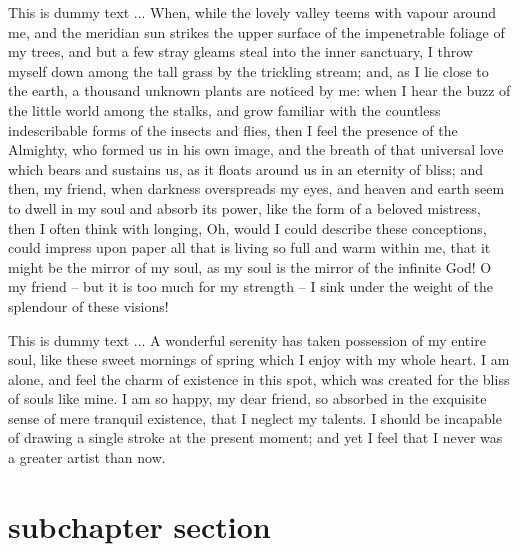 \documentclass[letterpaper,oneside,12pt]{book}
\begin{document}
This is dummy text ... When, while the lovely valley teems with vapour around me, and the meridian sun strikes the upper surface of the impenetrable foliage of my trees, and but a few stray gleams steal into the inner sanctuary, I throw myself down among the tall grass by the trickling stream; and, as I lie close to the earth, a thousand unknown plants are noticed by me: when I hear the buzz of the little world among the stalks, and grow familiar with the countless indescribable forms of the insects and flies, then I feel the presence of the Almighty, who formed us in his own image, and the breath of that universal love which bears and sustains us, as it floats around us in an eternity of bliss; and then, my friend, when darkness overspreads my eyes, and heaven and earth seem to dwell in my soul and absorb its power, like the form of a beloved mistress, then I often think with longing, Oh, would I could describe these conceptions, could impress upon paper all that is living so full and warm within me, that it might be the mirror of my soul, as my soul is the mirror of the infinite God! O my friend -- but it is too much for my strength -- I sink under the weight of the splendour of these visions!



This is dummy text ... A wonderful serenity has taken possession of my entire soul, like these sweet mornings of spring which I enjoy with my whole heart. I am alone, and feel the charm of existence in this spot, which was created for the bliss of souls like mine. I am so happy, my dear friend, so absorbed in the exquisite sense of mere tranquil existence, that I neglect my talents. I should be incapable of drawing a single stroke at the present moment; and yet I feel that I never was a greater artist than now.


\section{subchapter section}\label{subchapter-section-3}
\end{document}

